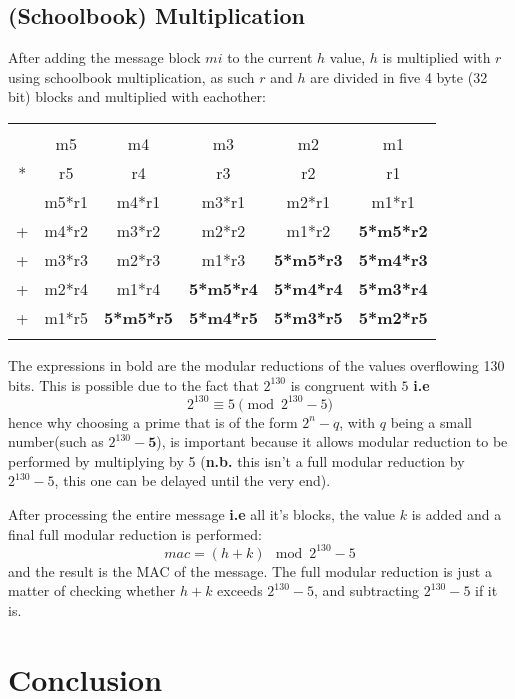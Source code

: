 \documentclass[twocolumn]{article}
\begin{document}
\subsection{(Schoolbook) Multiplication}
After adding the message block $mi$ to the current $h$ value, $h$ is multiplied with $r$ using schoolbook multiplication, as such $r$ and $h$ are divided in five 4 byte
(32 bit) blocks and multiplied with eachother:
\begin{tabular}{cccccc}
    &    &    &    &    &    \\
    & m5 & m4 & m3 & m2 & m1 \\
*   & r5 & r4 & r3 & r2 & r1 \\
\hline
    & m5*r1 & m4*r1 & m3*r1 & m2*r1 & m1*r1 \\
+   & m4*r2 & m3*r2 & m2*r2 & m1*r2 & \textbf{5*m5*r2} \\
+   & m3*r3 & m2*r3 & m1*r3 & \textbf{5*m5*r3} & \textbf{5*m4*r3} \\
+   & m2*r4 & m1*r4 & \textbf{5*m5*r4} & \textbf{5*m4*r4} & \textbf{5*m3*r4} \\
+   & m1*r5 & \textbf{5*m5*r5} & \textbf{5*m4*r5} & \textbf{5*m3*r5} & \textbf{5*m2*r5}\\
    &    &    &    &    &    \\
\end{tabular}
The expressions in bold are the modular reductions of the values overflowing 130 bits. This is possible due to the fact that $2^{130}$ is congruent with $5$ 
\textbf{i.e} $$2^{130} \equiv 5 \pmod{2^{130}-5}$$ hence why choosing a prime that is of the form $2^n-q$, with $q$ being a small number(such as $2^{130}-\textbf{5}$), 
is important because it allows modular reduction to be performed by multiplying by 5 (\textbf{n.b.} this isn't a full modular reduction by $2^{130}-5$, this one can be 
delayed until the very end).

After processing the entire message \textbf{i.e} all it's blocks, the value $k$ is added and a final full modular reduction is performed:
$$mac = (h+k) \mod{2^{130}-5} $$
and the result is the MAC of the message.
\newline
The full modular reduction is just a matter of checking whether $h+k$ exceeds $2^{130}-5$, and subtracting $2^{130}-5$ if it is.

\section{Conclusion}

\printbibliography
\end{document}
